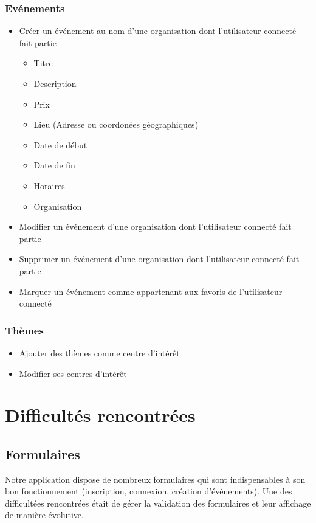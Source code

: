 \documentclass[11pt, a4paper, french, twoside]{article}
\begin{document}
			\subsubsection{Evénements}
				\begin{itemize}
					\item Créer un événement au nom d'une organisation dont l'utilisateur connecté fait partie
					\begin{itemize}
						\item Titre
						\item Description
						\item Prix
						\item Lieu (Adresse ou coordonées géographiques)
						\item Date de début
						\item Date de fin
						\item Horaires
						\item Organisation
					\end{itemize}
					\item Modifier un événement d'une organisation dont l'utilisateur connecté fait partie
					\item Supprimer un événement d'une organisation dont l'utilisateur connecté fait partie
					\item Marquer un événement comme appartenant aux favoris de  l'utilisateur connecté 
				\end{itemize}
		
			\subsubsection{Thèmes}
			
				\begin{itemize}
					\item Ajouter des thèmes comme centre d'intérêt
					\item Modifier ses centres d'intérêt
				\end{itemize}
	
	\section{Difficultés rencontrées}
		\subsection{Formulaires}
			Notre application dispose de nombreux formulaires qui sont indispensables à son bon fonctionnement (inscription, connexion, création d'événements). Une des difficultées rencontrées était de gérer la validation des formulaires et leur affichage de manière évolutive. 
			
\end{document}
